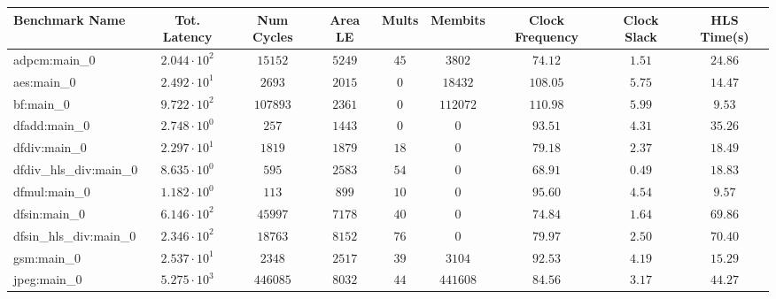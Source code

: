 \begin{tabular}{|l|c|c|c|c|c|c|c|c|}
\hline
Benchmark Name          & Tot. Latency           & Num Cycles & Area LE   & Mults   & Membits    & Clock Frequency & Clock Slack & HLS Time(s) \\
\hline
adpcm:main\_0           & $ 2.044 \cdot 10^{2} $ & $ 15152  $ & $ 5249  $ & $ 45  $ & $ 3802   $ & $ 74.12       $ & $ 1.51    $ & $ 24.86   $ \\
aes:main\_0             & $ 2.492 \cdot 10^{1} $ & $ 2693   $ & $ 2015  $ & $ 0   $ & $ 18432  $ & $ 108.05      $ & $ 5.75    $ & $ 14.47   $ \\
bf:main\_0              & $ 9.722 \cdot 10^{2} $ & $ 107893 $ & $ 2361  $ & $ 0   $ & $ 112072 $ & $ 110.98      $ & $ 5.99    $ & $ 9.53    $ \\
dfadd:main\_0           & $ 2.748 \cdot 10^{0} $ & $ 257    $ & $ 1443  $ & $ 0   $ & $ 0      $ & $ 93.51       $ & $ 4.31    $ & $ 35.26   $ \\
dfdiv:main\_0           & $ 2.297 \cdot 10^{1} $ & $ 1819   $ & $ 1879  $ & $ 18  $ & $ 0      $ & $ 79.18       $ & $ 2.37    $ & $ 18.49   $ \\
dfdiv\_hls\_div:main\_0 & $ 8.635 \cdot 10^{0} $ & $ 595    $ & $ 2583  $ & $ 54  $ & $ 0      $ & $ 68.91       $ & $ 0.49    $ & $ 18.83   $ \\
dfmul:main\_0           & $ 1.182 \cdot 10^{0} $ & $ 113    $ & $ 899   $ & $ 10  $ & $ 0      $ & $ 95.60       $ & $ 4.54    $ & $ 9.57    $ \\
dfsin:main\_0           & $ 6.146 \cdot 10^{2} $ & $ 45997  $ & $ 7178  $ & $ 40  $ & $ 0      $ & $ 74.84       $ & $ 1.64    $ & $ 69.86   $ \\
dfsin\_hls\_div:main\_0 & $ 2.346 \cdot 10^{2} $ & $ 18763  $ & $ 8152  $ & $ 76  $ & $ 0      $ & $ 79.97       $ & $ 2.50    $ & $ 70.40   $ \\
gsm:main\_0             & $ 2.537 \cdot 10^{1} $ & $ 2348   $ & $ 2517  $ & $ 39  $ & $ 3104   $ & $ 92.53       $ & $ 4.19    $ & $ 15.29   $ \\
jpeg:main\_0            & $ 5.275 \cdot 10^{3} $ & $ 446085 $ & $ 8032  $ & $ 44  $ & $ 441608 $ & $ 84.56       $ & $ 3.17    $ & $ 44.27   $ \\

\end{tabular}
